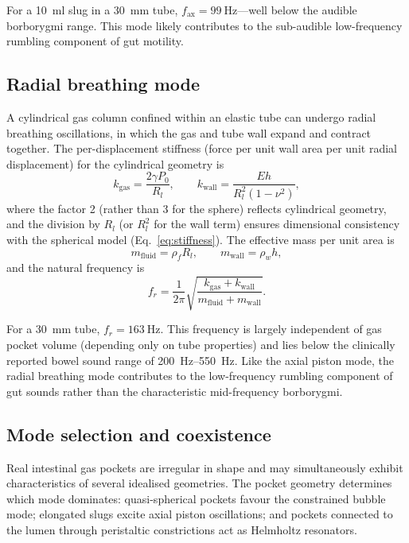 \documentclass[review]{elsarticle}
\begin{document}
For a \SI{10}{\milli\litre} slug in a \SI{30}{\milli\metre} tube,
$f_\mathrm{ax} = \SI{99}{\hertz}$---well below the audible borborygmi range.
This mode likely contributes to the sub-audible low-frequency rumbling
component of gut motility.

\subsection{Radial breathing mode}
\label{sec:radial}

A cylindrical gas column confined within an elastic tube can undergo radial
breathing oscillations, in which the gas and tube wall expand and contract
together.  The per-displacement stiffness (force per unit wall area per unit
radial displacement) for the cylindrical geometry is
\begin{equation}
  k_\mathrm{gas} = \frac{2\gamma P_0}{R_l}, \qquad
  k_\mathrm{wall} = \frac{Eh}{R_l^2(1-\nu^2)},
  \label{eq:radial_stiffness}
\end{equation}
where the factor 2 (rather than 3 for the sphere) reflects cylindrical
geometry, and the division by $R_l$ (or $R_l^2$ for the wall term) ensures
dimensional consistency with the spherical model
(Eq.~\eqref{eq:stiffness}).  The effective mass per unit area is
\begin{equation}
  m_\mathrm{fluid} = \rho_f R_l, \qquad
  m_\mathrm{wall} = \rho_w h,
  \label{eq:radial_mass}
\end{equation}
and the natural frequency is
\begin{equation}
  f_r = \frac{1}{2\pi}\sqrt{\frac{k_\mathrm{gas} + k_\mathrm{wall}}
    {m_\mathrm{fluid} + m_\mathrm{wall}}}.
  \label{eq:radial}
\end{equation}

For a \SI{30}{\milli\metre} tube, $f_r = \SI{163}{\hertz}$.  This frequency
is largely independent of gas pocket volume (depending only on tube
properties) and lies below the clinically reported bowel sound range of
\SIrange{200}{550}{\hertz}.  Like the axial piston mode, the radial breathing
mode contributes to the low-frequency rumbling component of gut sounds rather
than the characteristic mid-frequency borborygmi.

\subsection{Mode selection and coexistence}
\label{sec:mode_selection}

Real intestinal gas pockets are irregular in shape and may simultaneously
exhibit characteristics of several idealised geometries.  The pocket geometry
determines which mode dominates: quasi-spherical pockets favour the
constrained bubble mode; elongated slugs excite axial piston oscillations;
and pockets connected to the lumen through peristaltic constrictions act as
Helmholtz resonators.
\end{document}
